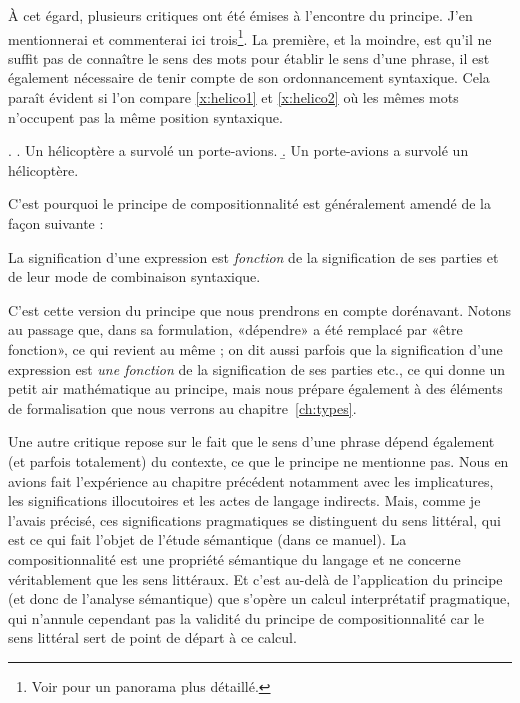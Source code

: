 À cet égard, plusieurs critiques ont été émises à l'encontre du
principe.  J'en mentionnerai et commenterai ici trois\footnote{Voir
  \citet{Godard:06} pour un panorama plus détaillé.}.  La première, et
la moindre, est qu'il ne suffit pas de connaître le sens des mots pour
établir le sens d'une phrase, il est également nécessaire de tenir
compte de son ordonnancement syntaxique.  Cela paraît évident si l'on
compare \ref{x:helico1} et \ref{x:helico2} où les mêmes mots n'occupent pas la même
position syntaxique.

\ex.  \a. \label{x:helico1}
Un hélicoptère a survolé un porte-avions.
\b.  \label{x:helico2}
Un porte-avions a survolé un hélicoptère.

C'est pourquoi le principe de compositionnalité est généralement
amendé de la façon suivante :

\begin{princ}
\label{p:compo2}
La signification d'une expression est \emph{fonction} de la
signification de ses parties et de leur mode de combinaison
syntaxique.
\end{princ}

C'est cette version du principe que nous prendrons en compte
dorénavant.  Notons au passage que, dans sa formulation,
«dépendre» a été remplacé par «être fonction», ce qui revient
au même ; on dit aussi parfois que la signification d'une expression
est \emph{une fonction} de la signification de ses parties etc., ce
qui donne un petit air mathématique au principe, mais nous prépare
également à des éléments de formalisation que nous verrons au
chapitre~\ref{ch:types}.

Une autre critique repose sur le fait que le sens d'une phrase dépend
également (et parfois totalement) du contexte, ce que le principe ne
mentionne pas.  Nous en avions fait l'expérience au chapitre précédent
notamment avec les implicatures, les significations illocutoires et
les actes de langage indirects.  Mais, comme je l'avais précisé, ces
significations pragmatiques se distinguent du sens littéral, qui est ce
qui fait l'objet de l'étude sémantique (dans ce manuel).  La
compositionnalité est une propriété sémantique du langage et ne
concerne véritablement que les sens littéraux.  Et c'est au-delà de
l'application du principe (et donc de l'analyse sémantique) que
s'opère un calcul interprétatif pragmatique, qui n'annule cependant
pas la validité du principe de compositionnalité car le sens littéral
sert de point de départ à ce calcul.

